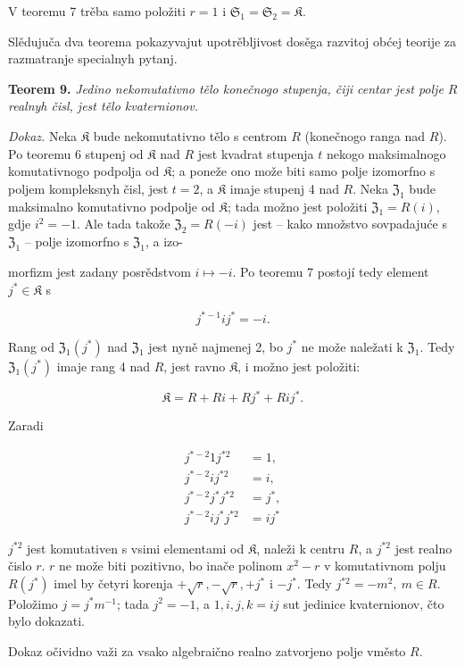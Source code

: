 \documentclass[11pt]{article}
\begin{document}
V teoremu 7 trěba samo položiti \(r=1\) i \(\mathfrak S_1=\mathfrak S_2=\mathfrak K\).

Slědujuča dva teorema pokazyvajut upotrěbljivost dosěga razvitoj obćej teorije za razmatranje specialnyh pytanj.

\textbf{Teorem 9.} \emph{Jedino nekomutativno tělo konečnogo stupenja, čiji centar jest polje \(R\) realnyh čisl, jest tělo kvaternionov.}

\emph{Dokaz.} Neka \(\mathfrak K\) bude nekomutativno tělo s centrom \(R\) (konečnogo ranga nad \(R\)). Po teoremu 6 stupenj od \(\mathfrak K\) nad \(R\) jest kvadrat stupenja \(t\) nekogo maksimalnogo komutativnogo podpolja od \(\mathfrak K\); a poneže ono može biti samo polje izomorfno s poljem kompleksnyh čisl, jest \(t=2\), a \(\mathfrak K\) imaje stupenj 4 nad \(R\). Neka \(\mathfrak Z_1\) bude maksimalno komutativno podpolje od \(\mathfrak K\); tada možno jest položiti \(\mathfrak Z_1=R(i)\), gdje \(i^2=-1\). Ale tada takože \(\mathfrak Z_2=R(-i)\) jest -- kako množstvo sovpadajuće s \(\mathfrak Z_1\) -- polje izomorfno s \(\mathfrak Z_1\), a izo-

morfizm jest zadany posrědstvom \(i\mapsto -i\). Po teoremu 7 postojí tedy element \(j^*\in\mathfrak K\) s

\[
j^{*-1}ij^*=-i.
\]

Rang od \(\mathfrak Z_1(j^*)\) nad \(\mathfrak Z_1\) jest nyně najmenej 2, bo \(j^*\) ne može naležati k \(\mathfrak Z_1\). Tedy \(\mathfrak Z_1(j^*)\) imaje rang 4 nad \(R\), jest ravno \(\mathfrak K\), i možno jest položiti:

\[
\mathfrak K=R+Ri+Rj^*+Rij^*.
\]

Zaradi

\[
\begin{aligned}
j^{*-2}1j^{*2}&=1,\\
j^{*-2}ij^{*2}&=i,\\
j^{*-2}j^*j^{*2}&=j^*,\\
j^{*-2}ij^*j^{*2}&=ij^*
\end{aligned}
\]

\(j^{*2}\) jest komutativen s vsimi elementami od \(\mathfrak K\), naleži k centru \(R\), a \(j^{*2}\) jest realno čislo \(r\). \(r\) ne može biti pozitivno, bo inače polinom \(x^2-r\) v komutativnom polju \(R(j^*)\) imel by četyri korenja \(+\sqrt r,-\sqrt r,+j^*\) i \(-j^*\). Tedy \(j^{*2}=-m^2,\ m\in R\). Položimo \(j=j^*m^{-1}\); tada \(j^2=-1\), a \(1,i,j,k=ij\) sut jedinice kvaternionov, čto bylo dokazati.

Dokaz očividno važi za vsako algebraično realno zatvorjeno polje vměsto \(R\).
\end{document}
